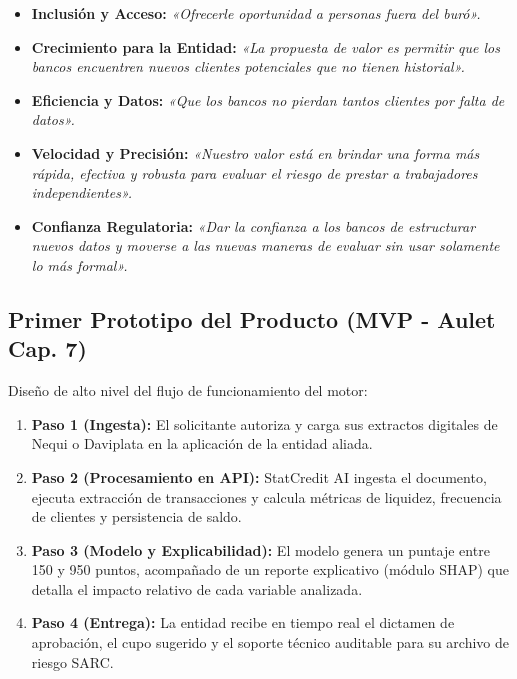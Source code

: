 \documentclass[11pt,a4paper]{article}
\begin{document}
\begin{tcolorbox}[colback=lightgray,colframe=primary,title={\textbf{S\'intesis de Post-its del Taller Creativo (2 de Octubre de 2026)}}]
\begin{itemize}[leftmargin=*]
    \item \textbf{Inclusi\'on y Acceso:} \textit{«Ofrecerle oportunidad a personas fuera del bur\'o».}
    \item \textbf{Crecimiento para la Entidad:} \textit{«La propuesta de valor es permitir que los bancos encuentren nuevos clientes potenciales que no tienen historial».}
    \item \textbf{Eficiencia y Datos:} \textit{«Que los bancos no pierdan tantos clientes por falta de datos».}
    \item \textbf{Velocidad y Precisi\'on:} \textit{«Nuestro valor est\'a en brindar una forma m\'as r\'apida, efectiva y robusta para evaluar el riesgo de prestar a trabajadores independientes».}
    \item \textbf{Confianza Regulatoria:} \textit{«Dar la confianza a los bancos de estructurar nuevos datos y moverse a las nuevas maneras de evaluar sin usar solamente lo m\'as formal».}
\end{itemize}
\end{tcolorbox}

\subsection{Primer Prototipo del Producto (MVP - Aulet Cap. 7)}
Dise\~no de alto nivel del flujo de funcionamiento del motor:

\begin{tcolorbox}[colback=lightgray,colframe=primary,title={\textbf{Flujo Operativo del Prototipo StatCredit AI}}]
\begin{enumerate}[leftmargin=*]
    \item \textbf{Paso 1 (Ingesta):} El solicitante autoriza y carga sus extractos digitales de Nequi o Daviplata en la aplicaci\'on de la entidad aliada.
    \item \textbf{Paso 2 (Procesamiento en API):} StatCredit AI ingesta el documento, ejecuta extracci\'on de transacciones y calcula m\'etricas de liquidez, frecuencia de clientes y persistencia de saldo.
    \item \textbf{Paso 3 (Modelo y Explicabilidad):} El modelo genera un puntaje entre 150 y 950 puntos, acompa\~nado de un reporte explicativo (m\'odulo SHAP) que detalla el impacto relativo de cada variable analizada.
    \item \textbf{Paso 4 (Entrega):} La entidad recibe en tiempo real el dictamen de aprobaci\'on, el cupo sugerido y el soporte t\'ecnico auditable para su archivo de riesgo SARC.
\end{enumerate}
\end{tcolorbox}
\end{document}
